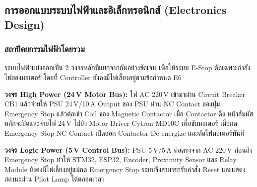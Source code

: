 


\subsection{การออกแบบระบบไฟฟ้าและอิเล็กทรอนิกส์ (Electronics Design)}
\label{subsec:electronics_design}

\subsubsection{สถาปัตยกรรมไฟฟ้าโดยรวม}
\label{subsubsec:electrical_architecture}

ระบบไฟฟ้าแบ่งออกเป็น 2 วงจรหลักที่แยกจากกันอย่างชัดเจน
เพื่อให้ระบบ E-Stop ตัดเฉพาะกำลังไฟของมอเตอร์
โดยที่ Controller ยังคงมีไฟเลี้ยงอยู่ตามข้อกำหนด E6

\textbf{วงจร High Power (24\,V Motor Bus):}
ไฟ AC 220\,V เข้ามาผ่าน Circuit Breaker CB1 แล้วจ่ายให้ PSU 24\,V/10\,A
Output ของ PSU ผ่าน NC Contact ของปุ่ม Emergency Stop
แล้วต่อเข้า Coil ของ Magnetic Contactor
เมื่อ Contactor ดึง หน้าสัมผัสหลักจะปิดและจ่ายไฟ 24\,V
ไปยัง Motor Driver Cytron MD10C เพื่อขับมอเตอร์
เมื่อกด Emergency Stop NC Contact เปิดออก
Contactor De-energize และตัดไฟมอเตอร์ทันที

\textbf{วงจร Logic Power (5\,V Control Bus):}
PSU 5\,V/5\,A ต่อตรงจาก AC 220\,V ก่อนถึง Emergency Stop
ทำให้ STM32, ESP32, Encoder, Proximity Sensor
และ Relay Module ยังคงมีไฟเลี้ยงอยู่แม้กด Emergency Stop
ระบบจึงสามารถรับคำสั่ง Reset และแสดงสถานะผ่าน Pilot Lamp ได้ตลอดเวลา

